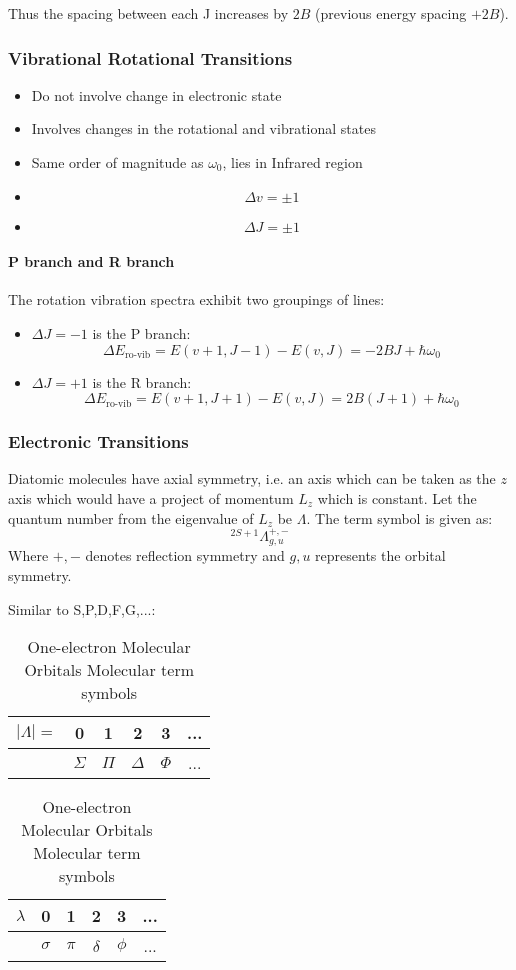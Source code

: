 \documentclass[12pt]{article}
\begin{document}
Thus the spacing between each J increases by $2B$ (previous energy spacing $+2B$).

\subsubsection{Vibrational Rotational Transitions}

\begin{itemize}
    \item Do not involve change in electronic state
    \item Involves changes in the rotational and vibrational states
    \item Same order of magnitude as $\omega_0$, lies in Infrared region
    \item \[ \Delta v = \pm 1\]
    \item \[ \Delta J = \pm 1\]
\end{itemize}

\paragraph{P branch and R branch}
The rotation vibration spectra exhibit two groupings of lines:
\begin{itemize}
    \item $\Delta J = -1$ is the P branch:
    \[\Delta E_\text{ro-vib} = E(v+1,J-1) - E(v,J) = -2BJ+\hbar\omega_0\]
    \item $\Delta J = +1$ is the R branch:
    \[\Delta E_\text{ro-vib} = E(v+1,J+1)-E(v,J) = 2B(J+1)+\hbar\omega_0\]
\end{itemize}

\subsubsection{Electronic Transitions}
Diatomic molecules have axial symmetry, i.e. an axis which can be taken as the $z$ axis which would have a project of momentum $L_z$ which is constant. Let the quantum number from the eigenvalue of $L_z$ be $\Lambda$. The term symbol is given as:
\[ ^{2S+1}\Lambda^{+,-}_{g,u}\]
Where $+,-$ denotes reflection symmetry and $g,u$ represents the orbital symmetry.

Similar to S,P,D,F,G,...:
\begin{table}[h]
    \centering
    \begin{tabular}{c||c|c|c|c|c}
         $|\Lambda|=$& 0 & 1 & 2 & 3 & ... \\
         \hline\hline
         & $\Sigma$ & $\Pi$ & $\Delta$ & $\Phi$ & ...
    \end{tabular}
    \caption{Molecular term symbols}
    \label{tab:molets}
      \begin{tabular}{c||c|c|c|c|c}
         $\lambda$& 0 & 1 & 2 & 3 & ... \\
         \hline\hline
         & $\sigma$ & $\pi$ & $\delta$ & $\phi$ & ...
    \end{tabular}
    \caption{One-electron Molecular Orbitals Molecular term symbols}
    \label{tab:onemolets}
\end{table}
\end{document}

